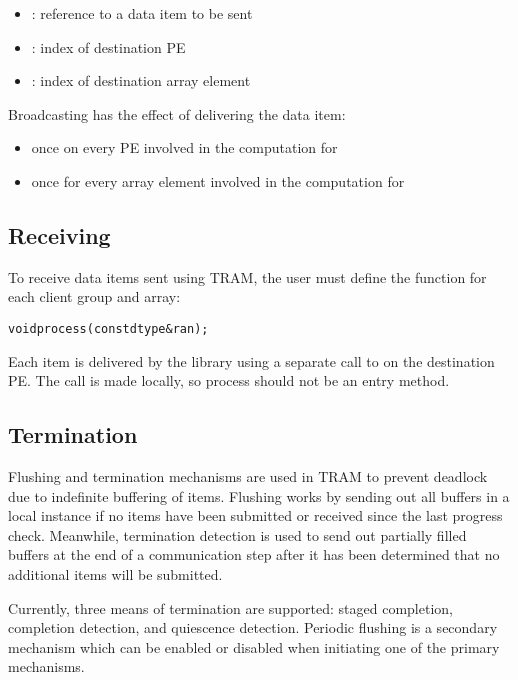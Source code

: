 \begin{itemize}
\item {}: reference to a data item to be sent
\item {}: index of destination PE
\item {}: index of destination array element
\end{itemize}

Broadcasting has the effect of delivering the data item:
\begin{itemize}
\item {once on every PE involved in the computation for }
\item {once for every array element involved in the computation for
       }
\end{itemize}


\subsection{Receiving}

To receive data items sent using TRAM, the user must define
the  function for each client group and array:

\begin{alltt}
void process(const dtype  &ran);
\end{alltt}

Each item is delivered by the library using a separate call to  on
the destination PE. The call is made locally, so process should not be an entry
method.

\subsection{Termination}
\label{sec:tram_termination}

Flushing and termination mechanisms are used in TRAM to prevent deadlock due to
indefinite buffering of items. Flushing works by sending out all buffers in a
local instance if no items have been submitted or received since the last
progress check. Meanwhile, termination detection is used to send out partially
filled buffers at the end of a communication step after it has been determined
that no additional items will be submitted.

Currently, three means of termination are supported: staged completion,
completion detection, and quiescence detection. Periodic flushing is a secondary
mechanism which can be enabled or disabled when initiating one of the primary
mechanisms.

